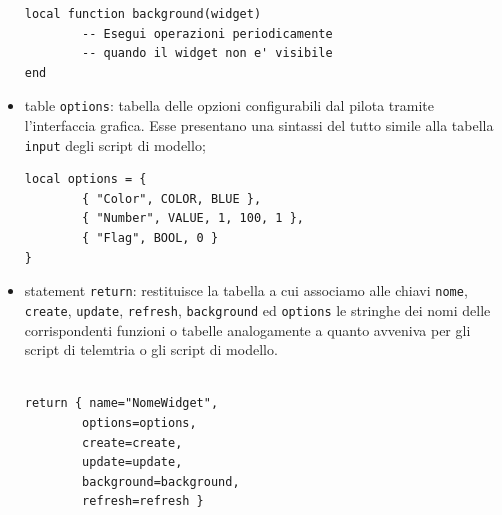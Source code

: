 \documentclass[a4paper, 12pt]{report}
\begin{document}
\begin{itemize}
\begin{lstlisting}
local function background(widget)
        -- Esegui operazioni periodicamente
        -- quando il widget non e' visibile
end
\end{lstlisting}
        \item table \texttt{options}: tabella delle opzioni configurabili dal pilota tramite l'interfaccia grafica. Esse presentano una sintassi del tutto simile alla tabella \texttt{input} degli script di modello;
\begin{lstlisting}
local options = {
        { "Color", COLOR, BLUE }, 
        { "Number", VALUE, 1, 100, 1 },
        { "Flag", BOOL, 0 } 
}
\end{lstlisting}
        \item statement \texttt{return}: restituisce la tabella a cui associamo alle chiavi \texttt{nome}, \texttt{create},  \texttt{update}, \texttt{refresh}, \texttt{background} ed \texttt{options} le stringhe dei nomi delle corrispondenti funzioni o tabelle analogamente a quanto avveniva per gli script di telemtria o gli script di modello.
\begin{lstlisting}

return { name="NomeWidget",
        options=options,
        create=create,
        update=update,
        background=background,
        refresh=refresh }

\end{lstlisting}
\end{itemize}
\end{document}
